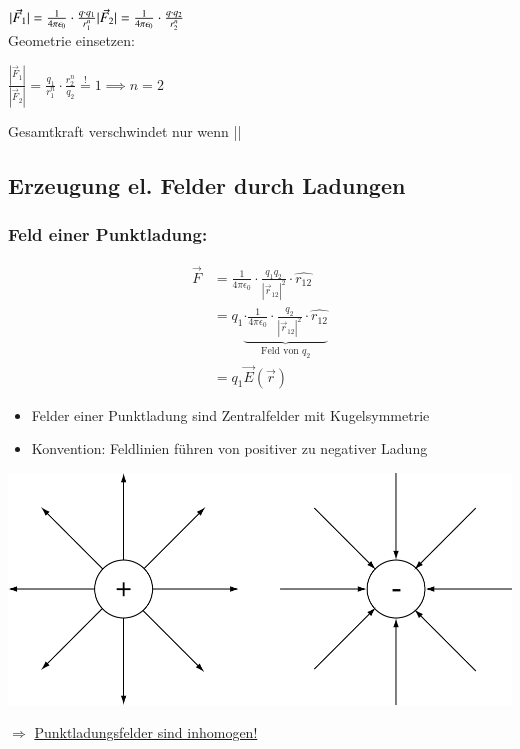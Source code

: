 \documentclass[11pt]{article}
\begin{document}
$\vert\vec{F}_1\vert = \frac{1}{4\pi\epsilon_0}\cdot\frac{q\cdot q_1}{r_1^n}\\
\vert\vec{F}_2\vert = \frac{1}{4\pi\epsilon_0}\cdot\frac{q\cdot q_2}{r_2^n}$\\

Geometrie einsetzen: 

$\frac{|\vec{F}_1|}{|\vec{F}_2|} = \frac{q_1}{r_1^n}\cdot \frac{r_2^n}{q_2} \overset{!}{=} 1 \implies n = 2$

Gesamtkraft verschwindet nur wenn || \propto {}

\subsection{Erzeugung el. Felder durch Ladungen}

	\subsubsection{Feld einer Punktladung:}
	
	\begin{align*}
		\vec{F} &= \frac{1}{4\pi\epsilon_0} \cdot \frac{q_1 q_2}{ |\vec{r}_{12}|^2 } \cdot \hat{r_{12}} \\
					&=q_1 \underbrace{ \cdot \frac{1}{4\pi\epsilon_0} \cdot \frac{q_2}{ |\vec{r}_{12}|^2 } \cdot \hat{r_{12}}  }_{\text{Feld von }q_2} \\
					&=q_1 \vec{E}(\vec{r})
	\end{align*}
	\begin{itemize}
		\item Felder einer Punktladung sind Zentralfelder mit Kugelsymmetrie
		\item Konvention: Feldlinien führen von positiver zu negativer Ladung
	\end{itemize}
	\begin{center}
		\includegraphics[width=0.7\linewidth]{skizzen/14/14_4B0}
	\end{center}

	$ \Rightarrow $ \underline{Punktladungsfelder sind inhomogen!}
	
\end{document}
